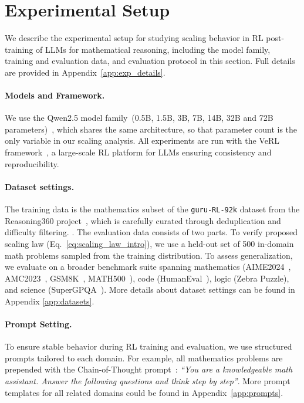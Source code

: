 \section{Experimental Setup}
\label{sec:experimental_setup}
We describe the experimental setup for studying scaling behavior in RL post-training of LLMs for mathematical reasoning, including the model family, training and evaluation data, and evaluation protocol in this section. Full details are provided in Appendix~\ref{app:exp_details}.

\paragraph{Models and Framework.} 
We use the Qwen2.5 model family~(0.5B, 1.5B, 3B, 7B, 14B, 32B and 72B parameters)~\citep{qwen2025qwen25technicalreport}, which shares the same architecture, so that parameter count is the only variable in our scaling analysis. All experiments are run with the VeRL framework~\citep{sheng2024hybridflow}, a large-scale RL platform for LLMs ensuring consistency and reproducibility.
\paragraph{Dataset settings.}The training data is the mathematics subset of the \texttt{guru-RL-92k} dataset from the Reasoning360 project~\citep{cheng2025revisiting}, which is carefully curated through deduplication and difficulty filtering. . The evaluation data consists of two parts. To verify proposed scaling law (Eq.~\ref{eq:scaling_law_intro}), we use a held-out set of 500 in-domain math problems sampled from the training distribution. To assess generalization, we evaluate on a broader benchmark suite spanning mathematics 
(AIME2024~\citep{patel2024aimeaioptimizationmultiple}, AMC2023~\citep{knoveleng_amc23_dataset}, GSM8K~\citep{cobbe2021trainingverifierssolvemath}, MATH500~\citep{lightman2023letsverifystepstep}), code (HumanEval~\citep{chen2021evaluatinglargelanguagemodels}), logic (Zebra Puzzle\citep{Lin_ZeroEval_A_Unified_2024}), and science (SuperGPQA~\citep{pteam2025supergpqascalingllmevaluation}). More details about dataset settings can be found in Appendix \ref{app:datasets}.

\paragraph{Prompt Setting.} To ensure stable behavior during RL training and evaluation, we use structured prompts tailored to each domain. For example, all mathematics problems are prepended with the Chain-of-Thought prompt~\citep{wei2023chainofthoughtpromptingelicitsreasoning}: \textit{``You are a knowledgeable math assistant. Answer the following questions and think step by step''}. More prompt templates for all related domains could be found in Appendix~\ref{app:prompts}.

